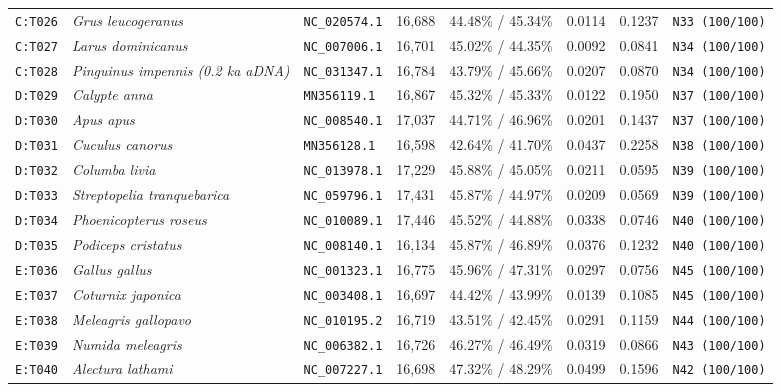 \documentclass[10pt,letterpaper]{article}
\begin{document}
\begin{longtable}{llllllll}
\texttt{C:T026} & \textit{Grus leucogeranus} & \texttt{NC\_020574.1} & 16,688 & 44.48\% / 45.34\% & 0.0114 & 0.1237 & \texttt{N33 (100/100)} \\
\texttt{C:T027} & \textit{Larus dominicanus} & \texttt{NC\_007006.1} & 16,701 & 45.02\% / 44.35\% & 0.0092 & 0.0841 & \texttt{N34 (100/100)} \\
\texttt{C:T028} & \textit{Pinguinus impennis (0.2 ka aDNA)} & \texttt{NC\_031347.1} & 16,784 & 43.79\% / 45.66\% & 0.0207 & 0.0870 & \texttt{N34 (100/100)} \\
\texttt{D:T029} & \textit{Calypte anna} & \texttt{MN356119.1} & 16,867 & 45.32\% / 45.33\% & 0.0122 & 0.1950 & \texttt{N37 (100/100)} \\
\texttt{D:T030} & \textit{Apus apus} & \texttt{NC\_008540.1} & 17,037 & 44.71\% / 46.96\% & 0.0201 & 0.1437 & \texttt{N37 (100/100)} \\
\texttt{D:T031} & \textit{Cuculus canorus} & \texttt{MN356128.1} & 16,598 & 42.64\% / 41.70\% & 0.0437 & 0.2258 & \texttt{N38 (100/100)} \\
\texttt{D:T032} & \textit{Columba livia} & \texttt{NC\_013978.1} & 17,229 & 45.88\% / 45.05\% & 0.0211 & 0.0595 & \texttt{N39 (100/100)} \\
\texttt{D:T033} & \textit{Streptopelia tranquebarica} & \texttt{NC\_059796.1} & 17,431 & 45.87\% / 44.97\% & 0.0209 & 0.0569 & \texttt{N39 (100/100)} \\
\texttt{D:T034} & \textit{Phoenicopterus roseus} & \texttt{NC\_010089.1} & 17,446 & 45.52\% / 44.88\% & 0.0338 & 0.0746 & \texttt{N40 (100/100)} \\
\texttt{D:T035} & \textit{Podiceps cristatus} & \texttt{NC\_008140.1} & 16,134 & 45.87\% / 46.89\% & 0.0376 & 0.1232 & \texttt{N40 (100/100)} \\
\texttt{E:T036} & \textit{Gallus gallus} & \texttt{NC\_001323.1} & 16,775 & 45.96\% / 47.31\% & 0.0297 & 0.0756 & \texttt{N45 (100/100)} \\
\texttt{E:T037} & \textit{Coturnix japonica} & \texttt{NC\_003408.1} & 16,697 & 44.42\% / 43.99\% & 0.0139 & 0.1085 & \texttt{N45 (100/100)} \\
\texttt{E:T038} & \textit{Meleagris gallopavo} & \texttt{NC\_010195.2} & 16,719 & 43.51\% / 42.45\% & 0.0291 & 0.1159 & \texttt{N44 (100/100)} \\
\texttt{E:T039} & \textit{Numida meleagris} & \texttt{NC\_006382.1} & 16,726 & 46.27\% / 46.49\% & 0.0319 & 0.0866 & \texttt{N43 (100/100)} \\
\texttt{E:T040} & \textit{Alectura lathami} & \texttt{NC\_007227.1} & 16,698 & 47.32\% / 48.29\% & 0.0499 & 0.1596 & \texttt{N42 (100/100)} \\

\end{longtable}
\end{document}
